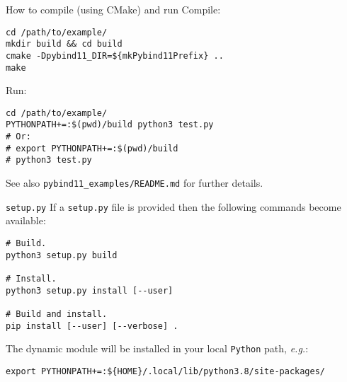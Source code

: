 \documentclass[aspectratio=169,11pt]{beamer}
\begin{document}
\begin{frame}[fragile]{How to compile (using CMake) and run}
    Compile:
    \begin{verbatim}
cd /path/to/example/
mkdir build && cd build
cmake -Dpybind11_DIR=${mkPybind11Prefix} ..
make
    \end{verbatim}
    Run:
    \begin{verbatim}
cd /path/to/example/
PYTHONPATH+=:$(pwd)/build python3 test.py
# Or:
# export PYTHONPATH+=:$(pwd)/build
# python3 test.py
    \end{verbatim}
    
    See also \texttt{pybind11\_examples/README.md} for further details.
\end{frame}

\begin{frame}[fragile]{\texttt{setup.py}}
    If a \texttt{setup.py} file is provided then the following commands become available:
    \begin{verbatim}
# Build.
python3 setup.py build

# Install.
python3 setup.py install [--user]

# Build and install.
pip install [--user] [--verbose] .
    \end{verbatim}
    The dynamic module will be installed in your local \texttt{Python} path, \textit{e.g.}:
{
    \small
    \begin{verbatim}
export PYTHONPATH+=:${HOME}/.local/lib/python3.8/site-packages/
    \end{verbatim}
}
\end{frame}
\end{document}
